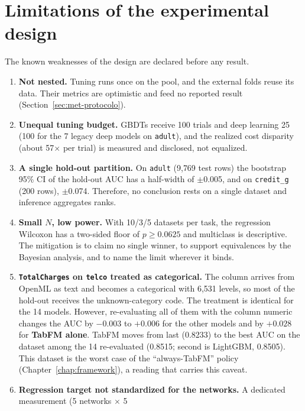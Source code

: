 \section{Limitations of the experimental design}
\label{sec:met-limitacoes}

The known weaknesses of the design are declared before any result.

\begin{enumerate}
  \item \textbf{Not nested.} Tuning runs once on the pool, and the external folds reuse its data. Their metrics are optimistic and feed no reported result (Section~\ref{sec:met-protocolo}).
  \item \textbf{Unequal tuning budget.} GBDTs receive 100 trials and
    deep learning 25 (100 for the 7 legacy deep models on \texttt{adult}), and the realized cost disparity (about 57$\times$
    per trial) is measured and disclosed, not equalized.
  \item \textbf{A single hold-out partition.} On \texttt{adult}
    (9{,}769 test rows) the bootstrap 95\% CI of the hold-out AUC
    has a half-width of $\pm$0.005, and on \texttt{credit\_g} (200
    rows), $\pm$0.074. Therefore, no conclusion rests on a single
    dataset and inference aggregates ranks.
  \item \textbf{Small $N$, low power.} With 10/3/5 datasets per
    task, the regression Wilcoxon has a two-sided floor of
    $p \ge 0.0625$ and multiclass is descriptive. The mitigation is
    to claim no single winner, to support equivalences by the
    Bayesian analysis, and to name the limit wherever it binds.
  \item \textbf{\texttt{TotalCharges} on \texttt{telco} treated as
    categorical.} The column arrives from OpenML as text and becomes
    a categorical with 6{,}531 levels, so most of the hold-out
    receives the unknown-category code. The treatment is identical
    for the 14 models. However, re-evaluating all of them with the
    column numeric changes the AUC by $-0.003$ to $+0.006$ for the
    other models and by $+0.028$ for \textbf{TabFM alone}. TabFM
    moves from last (0.8233) to the best AUC on the dataset among
    the 14 re-evaluated (0.8515; second is LightGBM, 0.8505). This
    dataset is the worst case of the ``always-TabFM'' policy
    (Chapter~\ref{chap:framework}), a reading that carries this
    caveat.
  \item \textbf{Regression target not standardized for the
    networks.} A dedicated measurement (5 networks $\times$ 5

\end{enumerate}
